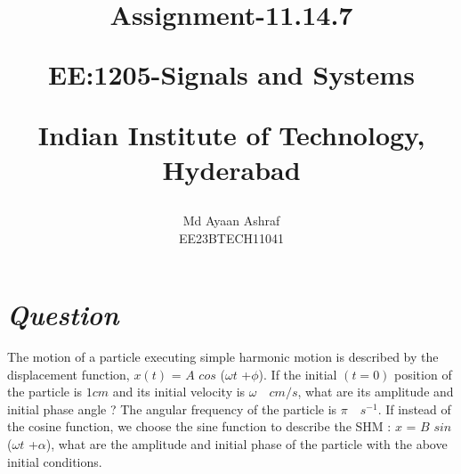 \documentclass[journal,12pt,twocolumn]{IEEEtran}
\theoremstyle{remark}
\begin{document}
%




\vspace{3cm}

\title{
Assignment-11.14.7 

\large{EE:1205-Signals and Systems}

Indian Institute of Technology, Hyderabad
}
\author{Md Ayaan Ashraf

EE23BTECH11041
}	

\maketitle

\newpage


\bigskip
\renewcommand{\thefigure}{\arabic{figure}}
\renewcommand{\thetable}{\arabic{table}}
\section*{\textbf{\textit{Question}}}
The motion of a particle executing simple harmonic motion is described by the
displacement function, $x(t)$ = $A$ $cos$ ($\omega$$t$ +$\phi$).
If the initial $(t = 0)$ position of the particle is $1 cm$ and its initial velocity is $\omega\quad cm/s$, what are its amplitude and initial phase angle ? The angular frequency of the particle is $\pi\quad s^{-1}$. If instead of the cosine function, we choose the sine function to describe the SHM : $x$ = $B$ $sin$ ($\omega$$t$ +$\alpha$), what are the amplitude and initial phase of the
particle with the above initial conditions.
\end{document}
